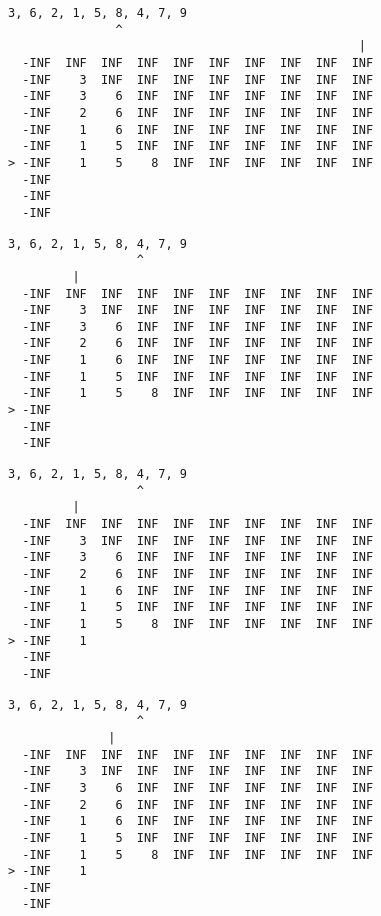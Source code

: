 { \begin{verbatim}
3, 6, 2, 1, 5, 8, 4, 7, 9
               ^
                                                 |
  -INF  INF  INF  INF  INF  INF  INF  INF  INF  INF
  -INF    3  INF  INF  INF  INF  INF  INF  INF  INF
  -INF    3    6  INF  INF  INF  INF  INF  INF  INF
  -INF    2    6  INF  INF  INF  INF  INF  INF  INF
  -INF    1    6  INF  INF  INF  INF  INF  INF  INF
  -INF    1    5  INF  INF  INF  INF  INF  INF  INF
> -INF    1    5    8  INF  INF  INF  INF  INF  INF
  -INF                                             
  -INF                                             
  -INF                                             
\end{verbatim} }

{ \begin{verbatim}
3, 6, 2, 1, 5, 8, 4, 7, 9
                  ^
         |
  -INF  INF  INF  INF  INF  INF  INF  INF  INF  INF
  -INF    3  INF  INF  INF  INF  INF  INF  INF  INF
  -INF    3    6  INF  INF  INF  INF  INF  INF  INF
  -INF    2    6  INF  INF  INF  INF  INF  INF  INF
  -INF    1    6  INF  INF  INF  INF  INF  INF  INF
  -INF    1    5  INF  INF  INF  INF  INF  INF  INF
  -INF    1    5    8  INF  INF  INF  INF  INF  INF
> -INF                                             
  -INF                                             
  -INF                                             
\end{verbatim} }

{ \begin{verbatim}
3, 6, 2, 1, 5, 8, 4, 7, 9
                  ^
         |
  -INF  INF  INF  INF  INF  INF  INF  INF  INF  INF
  -INF    3  INF  INF  INF  INF  INF  INF  INF  INF
  -INF    3    6  INF  INF  INF  INF  INF  INF  INF
  -INF    2    6  INF  INF  INF  INF  INF  INF  INF
  -INF    1    6  INF  INF  INF  INF  INF  INF  INF
  -INF    1    5  INF  INF  INF  INF  INF  INF  INF
  -INF    1    5    8  INF  INF  INF  INF  INF  INF
> -INF    1                                        
  -INF                                             
  -INF                                             
\end{verbatim} }

{ \begin{verbatim}
3, 6, 2, 1, 5, 8, 4, 7, 9
                  ^
              |
  -INF  INF  INF  INF  INF  INF  INF  INF  INF  INF
  -INF    3  INF  INF  INF  INF  INF  INF  INF  INF
  -INF    3    6  INF  INF  INF  INF  INF  INF  INF
  -INF    2    6  INF  INF  INF  INF  INF  INF  INF
  -INF    1    6  INF  INF  INF  INF  INF  INF  INF
  -INF    1    5  INF  INF  INF  INF  INF  INF  INF
  -INF    1    5    8  INF  INF  INF  INF  INF  INF
> -INF    1                                        
  -INF                                             
  -INF                                             
\end{verbatim} }

